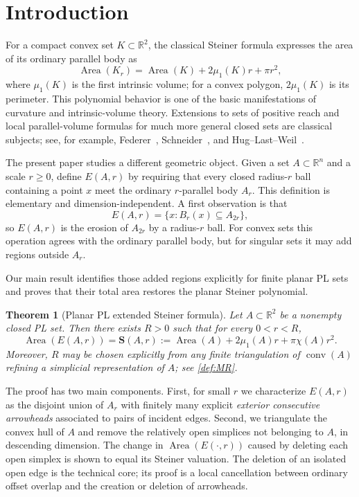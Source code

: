 \documentclass[11pt]{article}
\newtheorem{theorem}{Theorem}[section]
\newcommand{\R}{\mathbb R}
\newcommand{\Area}{\operatorname{Area}}
\newcommand{\Steiner}{\mathbf S}
\DeclareMathOperator{\conv}{conv}
\numberwithin{equation}{section}
\begin{document}
\section{Introduction}

For a compact convex set $K\subset\R^2$, the classical Steiner formula expresses the area of its ordinary parallel body as
\[
\Area(K_r)=\Area(K)+2\mu_1(K)r+\pi r^2,
\]
where $\mu_1(K)$ is the first intrinsic volume; for a convex polygon, $2\mu_1(K)$ is its perimeter. This polynomial behavior is one of the basic manifestations of curvature and intrinsic-volume theory. Extensions to sets of positive reach and local parallel-volume formulas for much more general closed sets are classical subjects; see, for example, Federer~\cite{Federer1959}, Schneider~\cite{Schneider2014}, and Hug--Last--Weil~\cite{HugLastWeil2004}.

The present paper studies a different geometric object. Given a set $A\subset\R^n$ and a scale $r\ge0$, define $E(A,r)$ by requiring that every closed radius-$r$ ball containing a point $x$ meet the ordinary $r$-parallel body $A_r$. This definition is elementary and dimension-independent. A first observation is that
\[
E(A,r)=\{x:B_r(x)\subseteq A_{2r}\},
\]
so $E(A,r)$ is the erosion of $A_{2r}$ by a radius-$r$ ball. For convex sets this operation agrees with the ordinary parallel body, but for singular sets it may add regions outside $A_r$.

Our main result identifies those added regions explicitly for finite planar PL sets and proves that their total area restores the planar Steiner polynomial.

\begin{theorem}[Planar PL extended Steiner formula]\label{thm:main-intro}
Let $A\subset\R^2$ be a nonempty closed PL set. Then there exists $R>0$ such that for every $0<r<R$,
\[
\boxed{
\Area(E(A,r))
=
\Steiner(A,r)
:=
\Area(A)+2\mu_1(A)r+\pi\chi(A)r^2.
}
\]
Moreover, $R$ may be chosen explicitly from any finite triangulation of $\conv(A)$ refining a simplicial representation of $A$; see \cref{def:MR}.
\end{theorem}

The proof has two main components. First, for small $r$ we characterize $E(A,r)$ as the disjoint union of $A_r$ with finitely many explicit \emph{exterior consecutive arrowheads} associated to pairs of incident edges. Second, we triangulate the convex hull of $A$ and remove the relatively open simplices not belonging to $A$, in descending dimension. The change in $\Area(E(\cdot,r))$ caused by deleting each open simplex is shown to equal its Steiner valuation. The deletion of an isolated open edge is the technical core; its proof is a local cancellation between ordinary offset overlap and the creation or deletion of arrowheads.
\end{document}
